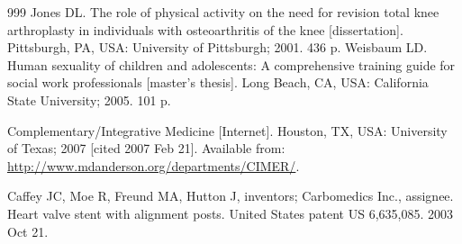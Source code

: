 \documentclass[journal,article,submit,moreauthors,pdftex]{Definitions/tsp}
\begin{document}
\begin{thebibliography}{999}
Jones DL. The role of physical activity on the need for revision total knee arthroplasty in individuals with osteoarthritis of the knee [dissertation]. Pittsburgh, PA, USA: University of Pittsburgh; 2001. 436 p.
Weisbaum LD. Human sexuality of children and adolescents: A comprehensive training guide for social work professionals [master’s thesis]. Long Beach, CA, USA: California State University; 2005. 101 p.

Complementary/Integrative Medicine [Internet]. Houston, TX, USA: University of Texas; 2007 [cited 2007 Feb 21]. Available from: \url{http://www.mdanderson.org/departments/CIMER/}.

Caffey JC, Moe R, Freund MA, Hutton J, inventors; Carbomedics Inc., assignee. Heart valve stent with alignment posts. United States patent US 6,635,085. 2003 Oct 21.
\end{thebibliography}
\end{document}
